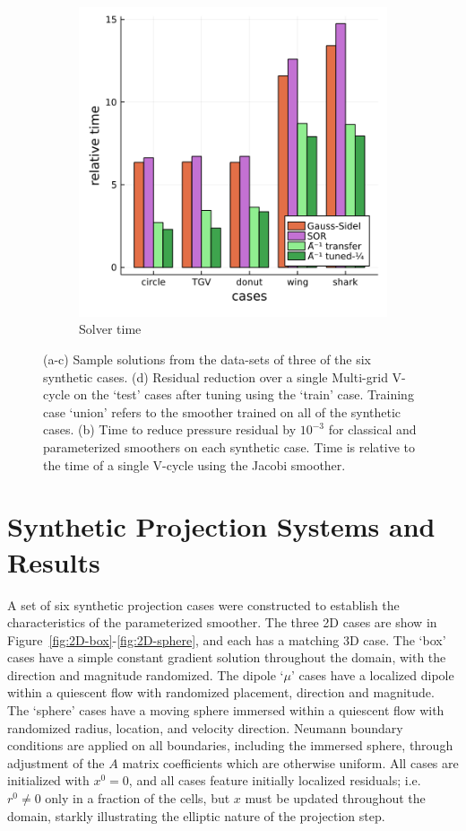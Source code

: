 \documentclass[review]{elsarticle}
\begin{document}
\begin{figure}
\begin{subfigure}[b]{0.47\textwidth}
        \includegraphics[width=\textwidth]{figures/crosscount.png}
        \caption{Solver time}
        \label{fig:synthetic time}
    \end{subfigure}
    \caption{(a-c) Sample solutions from the data-sets of three of the six synthetic cases. (d) Residual reduction over a single Multi-grid V-cycle on the `test' cases after tuning using the `train' case. Training case `union' refers to the smoother trained on all of the synthetic cases. (b) Time to reduce pressure residual by $10^{-3}$ for classical and parameterized smoothers on each synthetic case. Time is relative to the time of a single V-cycle using the Jacobi smoother.}
    \label{fig:synthetic cases}
\end{figure}

\section{Synthetic Projection Systems and Results}

A set of six synthetic projection cases were constructed to establish the characteristics of the parameterized smoother. The three 2D cases are show in Figure~\ref{fig:2D-box}-\ref{fig:2D-sphere}, and each has a matching 3D case. The `box' cases have a simple constant gradient solution throughout the domain, with the direction and magnitude randomized. The dipole `$\mu$' cases have a localized dipole within a quiescent flow with randomized placement, direction and magnitude. The `sphere' cases have a moving sphere immersed within a quiescent flow with randomized radius, location, and velocity direction. Neumann boundary conditions are applied on all boundaries, including the immersed sphere, through adjustment of the $A$ matrix coefficients which are otherwise uniform. All cases are initialized with $x^0=0$, and all cases feature initially localized residuals; i.e. $r^0\ne0$ only in a fraction of the cells, but $x$ must be updated throughout the domain, starkly illustrating the elliptic nature of the projection step. 
\end{document}
